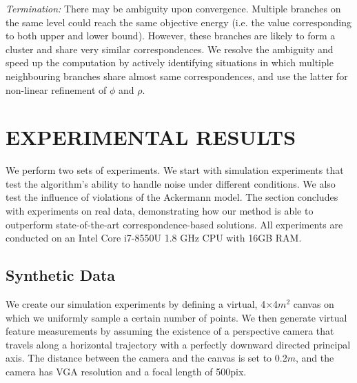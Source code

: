 \documentclass[letterpaper, 10 pt, conference]{ieeeconf}  %
\begin{document}
\textit{Termination:} There may be ambiguity upon convergence. Multiple branches on the same level could reach the same objective energy (i.e. the value corresponding to both upper and lower bound). However, these branches are likely to form a cluster and share very similar correspondences. We resolve the ambiguity and speed up the computation by actively identifying situations in which multiple neighbouring branches share almost same correspondences, and use the latter for non-linear refinement of $\phi$ and $\rho$.


\section{EXPERIMENTAL RESULTS}
\label{sec:experiments}

We perform two sets of experiments. We start with simulation experiments that test the algorithm's ability to handle noise under different conditions. We also test the influence of violations of the Ackermann model. The section concludes with experiments on real data, demonstrating how our method is able to outperform state-of-the-art correspondence-based solutions. All experiments are conducted on an Intel Core i7-8550U 1.8 GHz CPU with 16GB RAM.

\subsection{Synthetic Data}

We create our simulation experiments by defining a virtual, 4$\times$4$m^2$ canvas on which we uniformly sample a certain number of points. We then generate virtual feature measurements by assuming the existence of a perspective camera that travels along a horizontal trajectory with a perfectly downward directed principal axis. The distance between the camera and the canvas is set to 0.2$m$, and the camera has VGA resolution and a focal length of 500pix.
\end{document}
